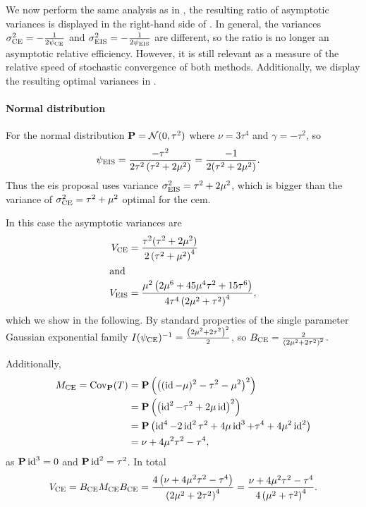 \begin{example}
    We now perform the same analysis as in , the resulting ratio of asymptotic variances is displayed in the right-hand side of . In general, the variances $\sigma^{2}_{\ce} = -\frac{1}{2\pce}$ and $\sigma^{2}_{\eis} = -\frac{1}{2\peis}$ are different, so the ratio is no longer an asymptotic relative efficiency. However, it is still relevant as a measure of the relative speed of stochastic convergence of both methods. Additionally, we display the resulting optimal variances in .

    \paragraph{Normal distribution}
    For the normal distribution $\P = \mathcal N (0, \tau^{2})$ where $\nu = 3 \tau^{4}$ and $\gamma = -\tau^{2}$, so 
    \begin{align*}
        \peis &= \frac{-\tau^{2}}{2\tau^{2} \left( \tau^{2} + 2\mu^{2} \right)} = \frac{-1}{2(\tau^{2} + 2\mu^{2})}.
    \end{align*}
    Thus the \gls{eis} proposal uses variance $\sigma^{2}_{\eis} = \tau^{2} + 2\mu^{2}$, which is bigger than the variance of $\sigma^{2}_{\ce} = \tau^{2} + \mu^{2}$ optimal for the \gls{cem}.

    In this case the asymptotic variances are
    \begin{align*}
        V_{\ce} &= \frac{\tau^{2}(\tau^{2} + 2\mu^{2})}{2 \left( \tau^{2} + \mu^{2} \right)^{4}}\\
        \intertext{and}
        V_{\eis} &= \frac{\mu^{2} \left(2 \mu^{6} + 45 \mu^{4} \tau^{2} + 15 \tau^{6}\right)}{4 \tau^{4} \left(2 \mu^{2} + \tau^{2}\right)^{4}},
    \end{align*}
    which we show in the following. By standard properties of the single parameter Gaussian exponential family $I(\psi_{\ce})^{-1} = \frac{ \left(2\mu^{2} + 2\tau^{2}\right)^{2}}{2} $, so $B_{\ce} = \frac{2}{\left(2\mu^{2} + 2\tau^{2}\right)^{2}}$. 

    Additionally,
    \begin{align*}
    M_{\ce} = \cov_{\P} (T) & = \P \left( \left((\id - \mu)^{2} - \tau^{2} - \mu^{2} \right)^{2}\right)\\
        &= \P \left( \left( \id^{2} - \tau^{2} + 2\mu\id \right)^{2} \right) \\
        &= \P \left(\id^{4} - 2\id^{2}\tau^{2} + 4 \mu \id^{3} + \tau^{4} + 4\mu^{2}\id^{2}\right)\\
        &= \nu + 4 \mu^{2}\tau^{2} - \tau^{4},
    \end{align*}
    as $\P \id^{3} = 0$ and $\P \id^{2} = \tau^{2}$. In total 
    $$
        V_{\ce} = B_{\ce} M_{\ce} B_{\ce} = \frac{4 \left(\nu + 4 \mu^{2}\tau^{2} - \tau^{4}\right)}{\left(2\mu^{2} + 2\tau^{2}\right)^{4}} = \frac{\nu + 4 \mu^{2}\tau^{2} - \tau^{4}}{4 \left( \mu^{2} + \tau^{2}\right)^{4}}.
    $$


\end{example}
